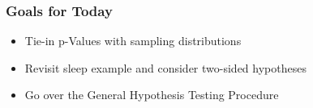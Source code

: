 \documentclass[handout]{beamer}
\newcommand{\blue}[1]{\textcolor{blue2}{#1}}
\begin{document}
%
%
%


\begin{frame}[fragile]
\frametitle{Goals for Today}

\begin{itemize}
\item Tie-in p-Values with sampling distributions
\item Revisit sleep example and consider two-sided hypotheses
\item Go over the General Hypothesis Testing Procedure
\end{itemize}

\end{frame}


%
%
%
%
\end{document}
